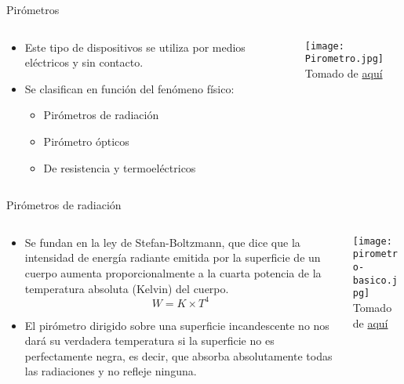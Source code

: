 \documentclass[aspectratio=169]{beamer}
\begin{document}
\begin{frame}{Pirómetros}
    \begin{columns}[c, onlytextwidth]
        \begin{column}{0.55\textwidth}
            \begin{itemize}
                \item Este tipo de dispositivos se utiliza por medios eléctricos y sin contacto.
                \item Se clasifican en función del fenómeno físico: 
                \begin{itemize}
                    \item Pirómetros de radiación
                    \item Pirómetro ópticos
                    \item De resistencia y termoeléctricos
                \end{itemize}
            \end{itemize}
        \end{column}
        \begin{column}{0.40\textwidth}
            \texttt{[image: Pirometro.jpg]}
            \\ \tiny{Tomado de \href{https://como-funciona.co/un-pirometro/}{aquí}}
        \end{column}
    \end{columns}
\end{frame}
\begin{frame}{Pirómetros de radiación}
    \begin{columns}[c, onlytextwidth]
        \begin{column}{0.55\textwidth}
            \begin{itemize}
                \item Se fundan en la ley de Stefan-Boltzmann, que dice que la intensidad de energía radiante emitida por la superficie de un cuerpo aumenta proporcionalmente a la cuarta potencia de la temperatura absoluta (Kelvin) del cuerpo.
                \begin{equation*}
                    W= K \times T^4
                \end{equation*}
                \item El pirómetro dirigido sobre una superficie incandescente no nos dará su verdadera temperatura si la superficie no es perfectamente negra, es decir, que absorba absolutamente todas las radiaciones y no refleje ninguna.
            \end{itemize}
        \end{column}
        \begin{column}{0.45\textwidth}
            \texttt{[image: pirometro-basico.jpg]}
            \\ \tiny{Tomado de \href{https://www.ingmecafenix.com/otros/pirometro/}{aquí}}
        \end{column}
    \end{columns}
\end{frame}
\end{document}
